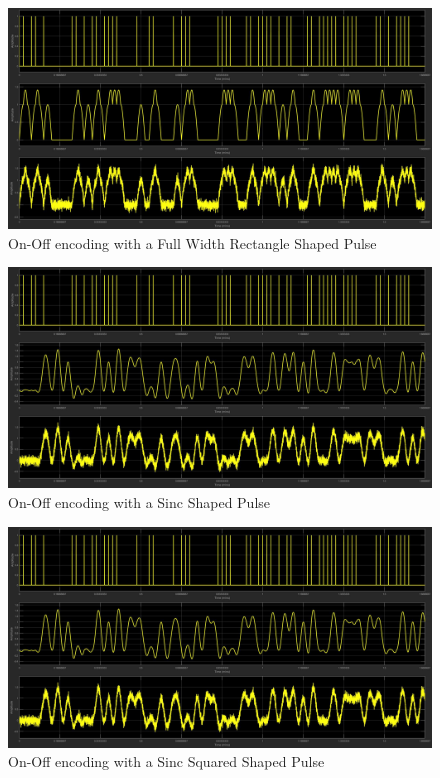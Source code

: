 \documentclass{article}
\begin{document}
\begin{figure}[H]
  \includegraphics[width = \linewidth]{OO_Sin.jpg}
  \caption{On-Off encoding with a Full Width Rectangle Shaped Pulse}
  \label{fig:OO-Sin}
\end{figure}
\begin{figure}[H]
  \includegraphics[width = \linewidth]{OO_Sinc.jpg}
  \caption{On-Off encoding with a Sinc Shaped Pulse}
  \label{fig:OO-Sinc}
\end{figure}
\begin{figure}[H]
  \includegraphics[width = \linewidth]{OO_Squared.jpg}
  \caption{On-Off encoding with a Sinc Squared Shaped Pulse}
  \label{fig:OO-Squared}
\end{figure}
\end{document}
